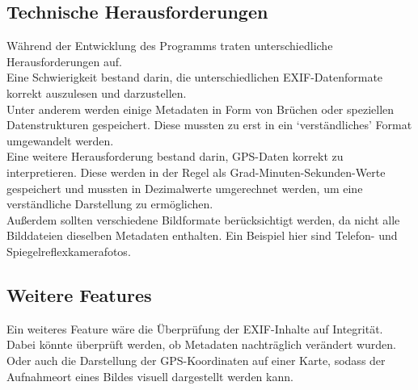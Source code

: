 \documentclass{Bild-Metadaten-Analyzer}
\begin{document}
\subsection{Technische Herausforderungen}\label{subsec:Technische Herausforderungen}
Während der Entwicklung des Programms traten unterschiedliche Herausforderungen auf. 
\\Eine Schwierigkeit bestand darin, die unterschiedlichen EXIF-Datenformate korrekt auszulesen und darzustellen.
\\Unter anderem werden einige Metadaten in Form von Brüchen oder speziellen Datenstrukturen gespeichert. Diese mussten zu erst in ein `verständliches' Format umgewandelt werden.
\\Eine weitere Herausforderung bestand darin, GPS-Daten korrekt zu interpretieren. Diese werden in der Regel als Grad-Minuten-Sekunden-Werte gespeichert 
und mussten in Dezimalwerte umgerechnet werden, um eine verständliche Darstellung zu ermöglichen.
\\Außerdem sollten verschiedene Bildformate berücksichtigt werden, da nicht alle Bilddateien dieselben Metadaten enthalten. Ein Beispiel hier 
sind Telefon- und Spiegelreflexkamerafotos.

\subsection{Weitere Features}\label{subsec:WeitereFeatures}
Ein weiteres Feature wäre die Überprüfung der EXIF-Inhalte auf Integrität. Dabei könnte überprüft werden, ob Metadaten nachträglich verändert wurden.
\\Oder auch die Darstellung der GPS-Koordinaten auf einer Karte, sodass der Aufnahmeort eines Bildes visuell dargestellt werden kann.

\clearpage



\end{document}
